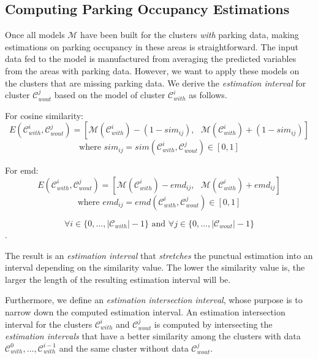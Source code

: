 	\subsection{Computing Parking Occupancy Estimations}
	Once all models $\mathcal{M}$ have been built for the clusters \textit{with} parking data, making estimations on parking occupancy in these areas is straightforward. The input data fed to the model is manufactured from averaging the predicted variables from the areas with parking data. However, we want to apply these models on the clusters that are missing parking data. We derive the \textit{estimation interval} for cluster $\mathcal{C}_{wout}^j$ based on the model of cluster $\mathcal{C}_{with}^i$ as follows.
	
	For cosine similarity:
	\begin{equation}
	E(\mathcal{C}_{with}^i,\mathcal{C}_{wout}^j) = [\mathcal{M}(\mathcal{C}_{with}^i) - (1 - sim_{ij}), \text{    } \mathcal{M}(\mathcal{C}_{with}^i) + (1 - sim_{ij})]
	\end{equation}
	$$\text{where } sim_{ij} = sim(\mathcal{C}_{with}^i,\mathcal{C}_{wout}^j) \in [0,1]$$
	
	For emd:
	\begin{equation}
	E(\mathcal{C}_{with}^i,\mathcal{C}_{wout}^j) = [\mathcal{M}(\mathcal{C}_{with}^i) - emd_{ij},   \text{    }\mathcal{M}(\mathcal{C}_{with}^i) + emd_{ij}]
	\end{equation}
	$$\text{where } emd_{ij} = emd(\mathcal{C}_{with}^i,\mathcal{C}_{wout}^j) \in [0,1]$$
	
	$$\forall i \in \{0,...,|\mathcal{C}_{with}|-1\} \text{ and } \forall j \in \{0,...,|\mathcal{C}_{wout}|-1\}$$.
	
	The result is an \textit{estimation interval} that \textit{stretches} the punctual estimation into an interval depending on the similarity value. The lower the similarity value is, the larger the length of the resulting estimation interval will be.
	
	
	Furthermore, we define an \textit{estimation intersection interval}, whose purpose is to narrow down the computed estimation interval.
	An estimation intersection interval for the clusters $\mathcal{C}_{with}^i$ and $\mathcal{C}_{wout}^j$ is computed by intersecting the \textit{estimation intervals} that have a better similarity among the clusters with data $\mathcal{C}_{with}^{0}, ..., \mathcal{C}_{with}^{i-1}$ and the same cluster without data $\mathcal{C}_{wout}^j$.
	
